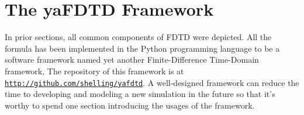 \section{The yaFDTD Framework}

In prior sections, all common components of FDTD were depicted. All the formula has been implemented in the Python programming
language to be a software framework named yet another Finite-Difference Time-Domain framework, The repository of this
framework is at \texttt{\url{http://github.com/shelling/yafdtd}}. A well-designed framework can reduce the time to developing and
modeling a new simulation in the future so that it's worthy to spend one section introducing the usages of the
framework.
